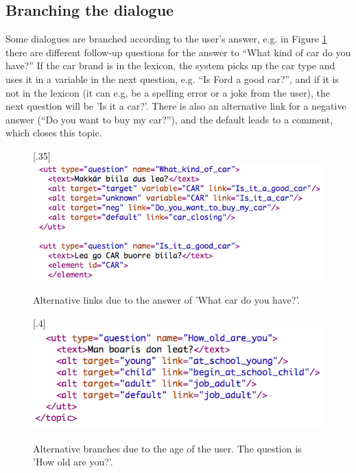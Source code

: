 \documentclass[11pt]{article}
\begin{document}
\subsection{Branching the dialogue} 
Some dialogues are branched according to the user's answer, e.g. in Figure \ref{car} there are different follow-up questions for the answer to “What kind of car do you have?” If the car brand is in the lexicon, the system picks up the car type and uses it in a variable in the next question, e.g. “Is Ford a good car?”, and if it is not in the lexicon (it can e.g. be a spelling error or a joke from the user), the next question will be 'Is it a car?'. There is also an alternative link for a negative answer (“Do you want to buy my car?”), and the default leads to a comment, which closes this topic. \\

\begin{figure}[htbp]
\begin{center}
\scalebox{.35}[.35]{\includegraphics{presentation/img/what_car.png}}\\
\caption{Alternative links due to the answer of 'What car do you have?'.}
\label{car}
\end{center}
\end{figure}

\begin{figure}[htbp]
\begin{center}
\scalebox{.4}[.4]{\includegraphics{presentation/img/age_branching.png}}\\
\caption{Alternative branches due to the age of the user. The question is 'How old are you?'.}
\label{agebranches}
\end{center}
\end{figure}
\end{document}
